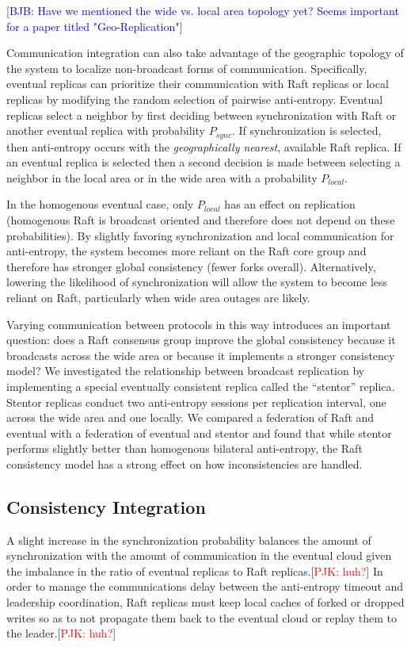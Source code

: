 \documentclass[10pt,conference,letterpaper]{IEEEtran}
\newcommand{\todo}[1]{{\textcolor{red}{#1}}}
\newcommand{\blue}[1]{{\textcolor{blue}{#1}}}
\newcommand{\pjk}[1]{[\todo{PJK: #1}]}
\newcommand{\bjb}[1]{[\blue{BJB: #1}]}
\begin{document}
\bjb{Have we mentioned the wide vs. local area topology yet? Seems important for a paper titled "Geo-Replication"}

Communication integration can also take advantage of the geographic topology of the
system to localize non-broadcast forms of communication.
Specifically, eventual replicas can prioritize their communication with Raft replicas or
local replicas by modifying the random selection of pairwise anti-entropy.
Eventual replicas select a neighbor by first deciding between synchronization with Raft
or another eventual replica with probability $P_{sync}$.
If synchronization is selected, then anti-entropy occurs with the \textit{geographically
nearest}, available Raft replica.
If an eventual replica is selected then a second decision is made between selecting a
neighbor in the local area or in the wide area with a probability $P_{local}$.

In the homogenous eventual case, only $P_{local}$ has an effect on replication
(homogenous Raft is broadcast oriented and therefore does not depend on these
probabilities).
By slightly favoring synchronization and local communication for anti-entropy, the
system becomes more reliant on the Raft core group and therefore has stronger global
consistency (fewer forks overall).
Alternatively, lowering the likelihood of synchronization will allow the system to become
less reliant on Raft, particularly when wide area outages are likely.

Varying communication between protocols in this way introduces an important question:
does a Raft consensus group improve the global consistency because it broadcasts across
the wide area or because it implements a stronger consistency model?
We investigated the relationship between broadcast replication by implementing a special
eventually consistent replica called the ``stentor'' replica.
Stentor replicas conduct two anti-entropy sessions per replication interval, one across the wide area and one locally.
We compared a federation of Raft and eventual with a federation of eventual and stentor
and found that while stentor performs slightly better than homogenous bilateral anti-entropy, the Raft consistency model has a strong effect on how inconsistencies are
handled.

\subsection{Consistency Integration}

A slight increase in the synchronization probability balances the amount of
synchronization with the amount of communication in the eventual cloud given the imbalance
in the ratio of eventual replicas to Raft replicas.\pjk{huh?}
In order to manage the communications delay between the anti-entropy timeout and
leadership coordination, Raft replicas must keep local caches of forked or dropped writes so
as to not propagate them back to the eventual cloud or replay them to the leader.\pjk{huh?}
\end{document}
